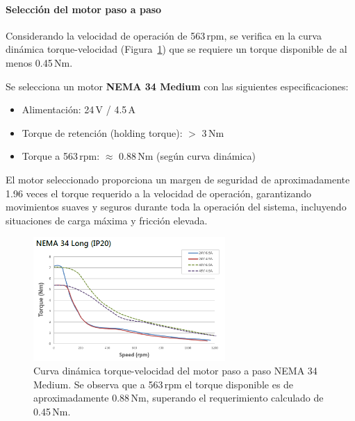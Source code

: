 \paragraph{Selección del motor paso a paso}
Considerando la velocidad de operación de 563\,rpm, se verifica en la curva dinámica torque-velocidad (Figura~\ref{fig:Curva_din_nema34}) que se requiere un torque disponible de al menos 0.45\,Nm.

Se selecciona un motor \textbf{NEMA 34 Medium} con las siguientes especificaciones:
\begin{itemize}
    \item Alimentación: 24\,V / 4.5\,A
    \item Torque de retención (holding torque): $>$ 3\,Nm
    \item Torque a 563\,rpm: $\approx$ 0.88\,Nm (según curva dinámica)
\end{itemize}

El motor seleccionado proporciona un margen de seguridad de aproximadamente 1.96 veces el torque requerido a la velocidad de operación, garantizando movimientos suaves y seguros durante toda la operación del sistema, incluyendo situaciones de carga máxima y fricción elevada.

\begin{figure}[H]
    \centering
    \includegraphics[width=0.65\textwidth]{img/Nema34.png}
    \caption{Curva dinámica torque-velocidad del motor paso a paso NEMA 34 Medium. Se observa que a 563\,rpm el torque disponible es de aproximadamente 0.88\,Nm, superando el requerimiento calculado de 0.45\,Nm.}
    \label{fig:Curva_din_nema34}
\end{figure}